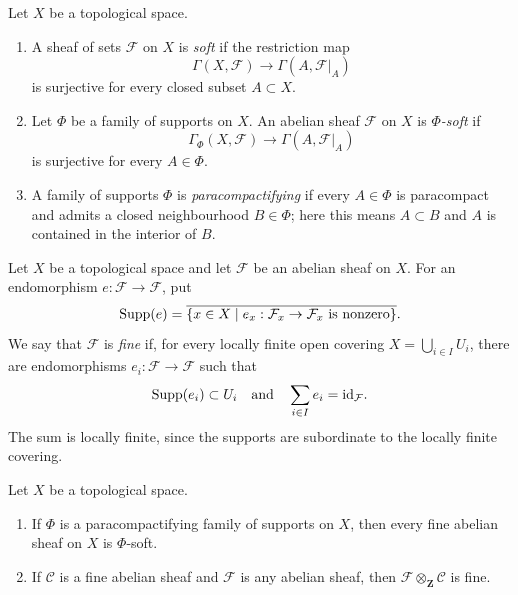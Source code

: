 \begin{definition}
\label{definition-soft-family-supports}
\begin{reference}
\cite[Chapter III, \S 3.3, p. 159]{Tohoku}
\end{reference}
Let $X$ be a topological space.
\begin{enumerate}
\item A sheaf of sets $\mathcal{F}$ on $X$ is {\it soft} if the restriction
map
$$
\Gamma(X, \mathcal{F}) \longrightarrow \Gamma(A, \mathcal{F}|_A)
$$
is surjective for every closed subset $A \subset X$.
\item Let $\Phi$ be a family of supports on $X$. An abelian sheaf
$\mathcal{F}$ on $X$ is {\it $\Phi$-soft} if
$$
\Gamma_\Phi(X, \mathcal{F}) \longrightarrow
\Gamma(A, \mathcal{F}|_A)
$$
is surjective for every $A \in \Phi$.
\item A family of supports $\Phi$ is {\it paracompactifying} if every
$A \in \Phi$ is paracompact and admits a closed neighbourhood
$B \in \Phi$; here this means $A \subset B$ and $A$ is contained in the
interior of $B$.
\end{enumerate}
\end{definition}

\begin{definition}
\label{definition-fine-abelian-sheaf}
\begin{reference}
\cite[Chapter III, \S 3.3, p. 160]{Tohoku}
\end{reference}
Let $X$ be a topological space and let $\mathcal F$ be an abelian sheaf
on $X$. For an endomorphism $e:\mathcal F\to\mathcal F$, put
$$
\mathop{\rm Supp}(e)=
\overline{\{x\in X\mid e_x:\mathcal F_x\to\mathcal F_x
\text{ is nonzero}\}}.
$$
We say that $\mathcal F$ is \emph{fine} if, for every locally finite open
covering $X=\bigcup_{i\in I}U_i$, there are endomorphisms
$e_i:\mathcal F\to\mathcal F$ such that
$$
\mathop{\rm Supp}(e_i)\subset U_i
\quad\text{and}\quad
\sum_{i\in I}e_i=\mathrm{id}_{\mathcal F}.
$$
The sum is locally finite, since the supports are subordinate to the
locally finite covering.
\end{definition}

\begin{lemma}
\label{lemma-fine-phi-soft-and-tensor}
Let $X$ be a topological space.
\begin{enumerate}
\item If $\Phi$ is a paracompactifying family of supports on $X$, then
every fine abelian sheaf on $X$ is $\Phi$-soft.
\item If $\mathcal C$ is a fine abelian sheaf and $\mathcal F$ is any
abelian sheaf, then $\mathcal F\otimes_{\mathbf Z}\mathcal C$ is fine.
\end{enumerate}
\end{lemma}

